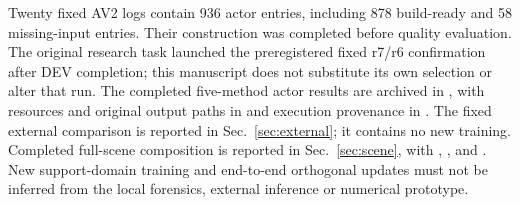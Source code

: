 Twenty fixed AV2 logs contain 936 actor entries, including 878 build-ready and 58 missing-input entries. Their construction was completed before quality evaluation. The original research task launched the preregistered fixed r7/r6 confirmation after DEV completion; this manuscript does not substitute its own selection or alter that run. The completed five-method actor results are archived in , with resources and original output paths in  and execution provenance in . The fixed external comparison is reported in Sec.~\ref{sec:external}; it contains no new training. Completed full-scene composition is reported in Sec.~\ref{sec:scene}, with , , and . New support-domain training and end-to-end orthogonal updates must not be inferred from the local forensics, external inference or numerical prototype.
